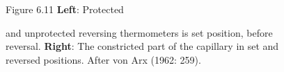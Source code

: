 \begin{figure}[t!]
\footnotesize
Figure 6.11 \textbf{Left}: Protected \rule{0mm}{4ex} and unprotected
reversing thermometers is set position,
before reversal.
\textbf{Right}: The constricted part of the capillary in set and
reversed positions. After von Arx (1962: 259).
\label{fig:thermometer}
\vspace{-3ex}
\end{figure}

